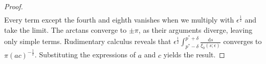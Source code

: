 \documentclass[11pt,a4paper]{article}
\numberwithin{equation}{section}
\begin{document}
\begin{proof}
\begin{align*}
    \end{align*}
    Every term except the fourth and eighth vanishes when we multiply with $\epsilon^{\frac{1}{2}}$ and take the limit. The arctans converge to $\pm\pi$, as their arguments diverge, leaving only simple terms. Rudimentary calculus reveals that $\epsilon^{\frac{1}{2}}\int_{p^*-\delta}^{p^*+\delta}\frac{\mathrm{d}s}{\xi_0(s;\epsilon)}$ converges to $\pi(ac)^{-\frac{1}{2}}$. Substituting the expressions of $a$ and $c$ yields the result.
\end{proof}
\newpage
\end{document}
